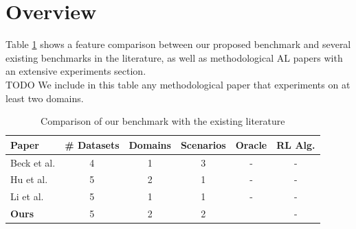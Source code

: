 \documentclass[]{article}
\begin{document}
\section{Overview}
Table \ref{tab:benchmark_comparison} shows a feature comparison between our proposed benchmark and several existing benchmarks in the literature, as well as methodological AL papers with an extensive experiments section. \\
{\color{red} TODO} We include in this table any methodological paper that experiments on at least two domains.
\begin{table}[h]
	\centering
	\begin{tabular}{l | c c c c c}
		Paper & \# Datasets & Domains & Scenarios & Oracle & RL Alg. \\
		\hline
		Beck et al. \cite{beck2021effective} & 4 & 1 & 3 & - & - \\
		Hu et al. \cite{hu2021towards} & 5 & 2 & 1 & - & - \\
		Li et al. \cite{li2022empirical} & 5 & 1 & 1 & - & - \\
		\textbf{Ours} & 5 & 2 & 2 & \checkmark & -
	\end{tabular}
	\caption{Comparison of our benchmark with the existing literature}
	\label{tab:benchmark_comparison}
\end{table}


\end{document}
